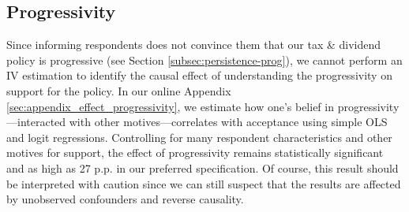 \documentclass[12pt]{article} %
\begin{document}



\subsection{Progressivity \label{sec:effect_progressivity}}

Since informing respondents does not convince them that our tax \& dividend policy is progressive (see Section \ref{subsec:persistence-prog}), we cannot perform an IV estimation to identify the causal effect of understanding the progressivity on support for the policy. In our online Appendix \ref{sec:appendix_effect_progressivity}, we estimate how one's belief in progressivity---interacted with other motives---correlates with acceptance using simple OLS and logit regressions. Controlling for many respondent characteristics and other motives for support, the effect of progressivity remains statistically significant and as high as 27 p.p. in our preferred specification. Of course, this result should be interpreted with caution since we can still suspect that the results are affected by unobserved confounders and reverse causality.
\end{document}
